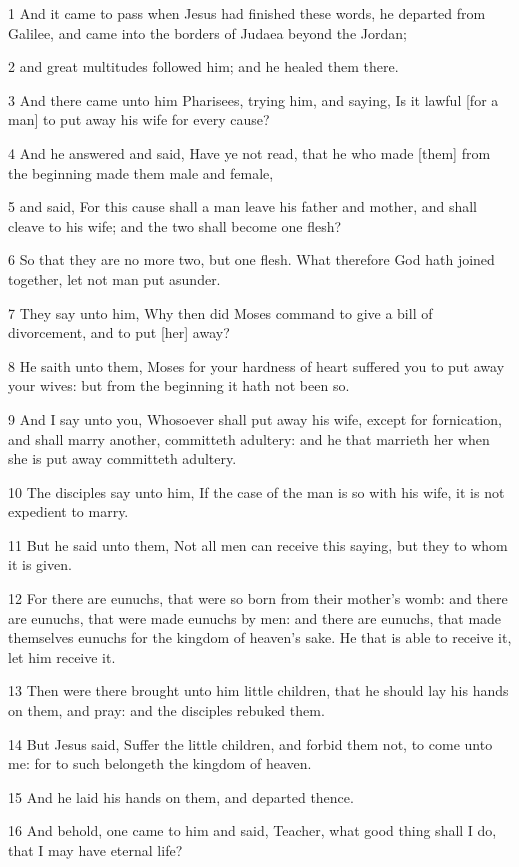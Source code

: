 \par 1 And it came to pass when Jesus had finished these words, he departed from Galilee, and came into the borders of Judaea beyond the Jordan;
\par 2 and great multitudes followed him; and he healed them there.
\par 3 And there came unto him Pharisees, trying him, and saying, Is it lawful [for a man] to put away his wife for every cause?
\par 4 And he answered and said, Have ye not read, that he who made [them] from the beginning made them male and female,
\par 5 and said, For this cause shall a man leave his father and mother, and shall cleave to his wife; and the two shall become one flesh?
\par 6 So that they are no more two, but one flesh. What therefore God hath joined together, let not man put asunder.
\par 7 They say unto him, Why then did Moses command to give a bill of divorcement, and to put [her] away?
\par 8 He saith unto them, Moses for your hardness of heart suffered you to put away your wives: but from the beginning it hath not been so.
\par 9 And I say unto you, Whosoever shall put away his wife, except for fornication, and shall marry another, committeth adultery: and he that marrieth her when she is put away committeth adultery.
\par 10 The disciples say unto him, If the case of the man is so with his wife, it is not expedient to marry.
\par 11 But he said unto them, Not all men can receive this saying, but they to whom it is given.
\par 12 For there are eunuchs, that were so born from their mother's womb: and there are eunuchs, that were made eunuchs by men: and there are eunuchs, that made themselves eunuchs for the kingdom of heaven's sake. He that is able to receive it, let him receive it.
\par 13 Then were there brought unto him little children, that he should lay his hands on them, and pray: and the disciples rebuked them.
\par 14 But Jesus said, Suffer the little children, and forbid them not, to come unto me: for to such belongeth the kingdom of heaven.
\par 15 And he laid his hands on them, and departed thence.
\par 16 And behold, one came to him and said, Teacher, what good thing shall I do, that I may have eternal life?
